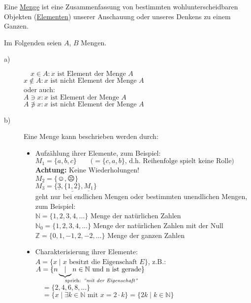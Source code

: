 \documentclass[a4paper, 12pt, twoside] {article}
\begin{document}
Eine \underline{Menge} ist eine Zusammenfassung von bestimmten wohlunterscheidbaren Objekten (\underline{Elementen}) unserer Anschauung oder unseres Denkens zu einem Ganzen.

Im Folgenden seien $A$, $B$ Mengen.

\begin{description}
\item[a)] 
	$\quad x \in A : x \text{ ist Element der Menge } A$ \\
	$x \notin A: x \text{ ist nicht Element der Menge } A$ \\
	oder auch: \\
	$A \ni x : x \text{ ist Element der Menge } A$ \\
	$A \not \ni x: x \text{ ist nicht Element der Menge } A$
\item[b)]
	Eine Menge kann beschrieben werden durch:
	\begin{itemize}
		\item Aufzählung ihrer Elemente, zum Beispiel: \\
		$M_1 = \{a,b,c\} \qquad \text{(}=\{c,a,b\} \text{, d.h. Reihenfolge spielt keine Rolle)}$ \\
		\textbf{Achtung:} Keine Wiederholungen! \\
		$M_2 = \{\smiley,\frownie\}$ \\
		$M_3 = \{ \underline{3}, \underline{\{1,2\}}, \underline{M_1}\}$ \\
		geht nur bei endlichen Mengen oder bestimmten unendlichen Mengen, zum Beispiel: \\
		$\mathbb{N} = \{1,2,3,4,...\}$ Menge der natürlichen Zahlen \\
		$\mathbb{N}_0 = \{1,2,3,4,...\}$ Menge der natürlichen Zahlen mit der Null \\
		$\mathbb{Z} = \{0,1,-1,2,-2,...\}$ Menge der ganzen Zahlen
		\item Charakterisierung ihrer Elemente: \\
		$A = \{x \mid x \text{ besitzt die Eigenschaft } E\}$, z.B.:\\
		$A = \{n \underbrace{\mid}_{\mathrlap{\text{sprich: \textit{''mit der Eigenschaft''}}}} n \in \mathbb{N} \text{ und n ist gerade}\}$\\
		$\quad = \{2,4,6,8,...\}$ \\
		$\quad = \{ x \mid \exists k \in \mathbb{N} \text{ mit } x = 2 \cdot k\} = \{2k \mid k \in \mathbb{N}\}$ \\
		

\end{itemize}
\end{description}
\end{document}
